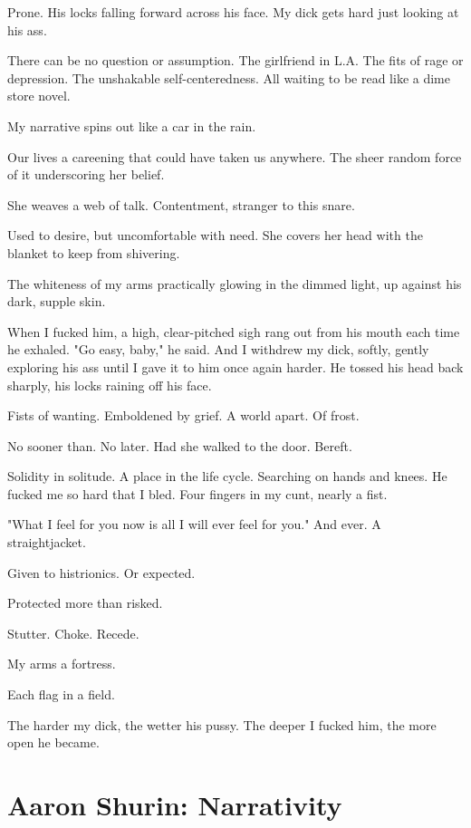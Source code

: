 \documentclass[
]{memoir}
\begin{document}
Prone. His locks falling forward across his face. My dick gets hard just
looking at his ass.

There can be no question or assumption. The girlfriend in L.A. The fits
of rage or depression. The unshakable self-centeredness. All waiting to
be read like a dime store novel.

My narrative spins out like a car in the rain.

Our lives a careening that could have taken us anywhere. The sheer
random force of it underscoring her belief.

She weaves a web of talk. Contentment, stranger to this snare.

Used to desire, but uncomfortable with need. She covers her head with
the blanket to keep from shivering.

The whiteness of my arms practically glowing in the dimmed light, up
against his dark, supple skin.

When I fucked him, a high, clear-pitched sigh rang out from his mouth
each time he exhaled. "Go easy, baby," he said. And I withdrew my dick,
softly, gently exploring his ass until I gave it to him once again
harder. He tossed his head back sharply, his locks raining off his face.

Fists of wanting. Emboldened by grief. A world apart. Of frost.

No sooner than. No later. Had she walked to the door. Bereft.

Solidity in solitude. A place in the life cycle. Searching on hands and
knees. He fucked me so hard that I bled. Four fingers in my cunt, nearly
a fist.

"What I feel for you now is all I will ever feel for you." And ever. A
straightjacket.

Given to histrionics. Or expected.

Protected more than risked.

Stutter. Choke. Recede.

My arms a fortress.

Each flag in a field.

The harder my dick, the wetter his pussy. The deeper I fucked him, the
more open he became.

\hypertarget{aaron-shurin-narrativity}{%
\chapter{Aaron Shurin: Narrativity}\label{aaron-shurin-narrativity}}
\end{document}
